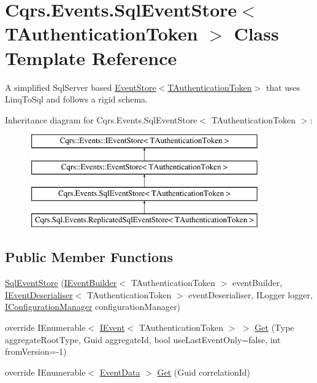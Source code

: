 \hypertarget{classCqrs_1_1Events_1_1SqlEventStore}{}\section{Cqrs.\+Events.\+Sql\+Event\+Store$<$ T\+Authentication\+Token $>$ Class Template Reference}
\label{classCqrs_1_1Events_1_1SqlEventStore}


A simplified Sql\+Server based \hyperlink{classCqrs_1_1Events_1_1EventStore_a6346cb2aea4c5b4e740dc6cfb15abab8}{Event\+Store$<$\+T\+Authentication\+Token$>$} that uses Linq\+To\+Sql and follows a rigid schema.  


Inheritance diagram for Cqrs.\+Events.\+Sql\+Event\+Store$<$ T\+Authentication\+Token $>$\+:\begin{figure}[H]
\begin{center}
\leavevmode
\includegraphics[height=4.000000cm]{classCqrs_1_1Events_1_1SqlEventStore}
\end{center}
\end{figure}
\subsection*{Public Member Functions}
\begin{DoxyCompactItemize}
\item 
\hyperlink{classCqrs_1_1Events_1_1SqlEventStore_a15df78a1b12d2e3035b9715e9bfc8535}{Sql\+Event\+Store} (\hyperlink{interfaceCqrs_1_1Events_1_1IEventBuilder}{I\+Event\+Builder}$<$ T\+Authentication\+Token $>$ event\+Builder, \hyperlink{interfaceCqrs_1_1Events_1_1IEventDeserialiser}{I\+Event\+Deserialiser}$<$ T\+Authentication\+Token $>$ event\+Deserialiser, I\+Logger logger, \hyperlink{interfaceCqrs_1_1Configuration_1_1IConfigurationManager}{I\+Configuration\+Manager} configuration\+Manager)
\item 
override I\+Enumerable$<$ \hyperlink{interfaceCqrs_1_1Events_1_1IEvent}{I\+Event}$<$ T\+Authentication\+Token $>$ $>$ \hyperlink{classCqrs_1_1Events_1_1SqlEventStore_a7e32a08a015642a5bc1cefa6998e6f11}{Get} (Type aggregate\+Root\+Type, Guid aggregate\+Id, bool use\+Last\+Event\+Only=false, int from\+Version=-\/1)
\item 
override I\+Enumerable$<$ \hyperlink{classCqrs_1_1Events_1_1EventData}{Event\+Data} $>$ \hyperlink{classCqrs_1_1Events_1_1SqlEventStore_ac1fb2bdec07cbeec57fb3d985e7a8b31}{Get} (Guid correlation\+Id)
\end{DoxyCompactItemize}
